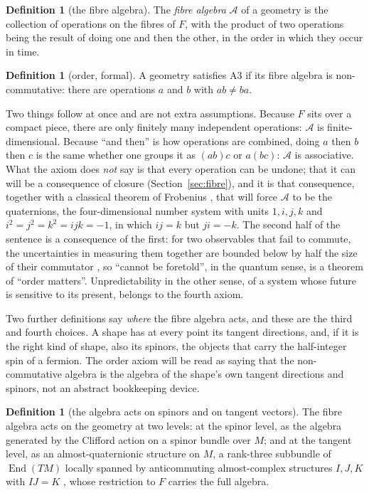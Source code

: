 \documentclass[11pt,a4paper]{article}
\theoremstyle{plain}
\theoremstyle{definition}
\newtheorem{definition}[theorem]{Definition}
\theoremstyle{remark}
\begin{document}
\begin{definition}[the fibre algebra]\label{def:fibrealg}
The \emph{fibre algebra} $\mathcal{A}$ of a geometry is the collection of operations on the fibres of $F$, with the product of two operations being the result of doing one and then the other, in the order in which they occur in time.
\end{definition}

\begin{definition}[order, formal]\label{def:A3}
A geometry satisfies A3 if its fibre algebra is non-commutative: there are operations $a$ and $b$ with $ab\neq ba$.
\end{definition}

Two things follow at once and are not extra assumptions. Because $F$ sits over a compact piece, there are only finitely many independent operations: $\mathcal{A}$ is finite-dimensional. Because ``and then'' is how operations are combined, doing $a$ then $b$ then $c$ is the same whether one groups it as $(ab)c$ or $a(bc)$: $\mathcal{A}$ is associative. What the axiom does \emph{not} say is that every operation can be undone; that it can will be a consequence of closure (Section~\ref{sec:fibre}), and it is that consequence, together with a classical theorem of Frobenius \cite{Frobenius1878}, that will force $\mathcal{A}$ to be the quaternions, the four-dimensional number system with units $1,i,j,k$ and $i^{2}=j^{2}=k^{2}=ijk=-1$, in which $ij=k$ but $ji=-k$. The second half of the sentence is a consequence of the first: for two observables that fail to commute, the uncertainties in measuring them together are bounded below by half the size of their commutator \cite{Robertson1929}, so ``cannot be foretold'', in the quantum sense, is a theorem of ``order matters''. Unpredictability in the other sense, of a system whose future is sensitive to its present, belongs to the fourth axiom.

Two further definitions say \emph{where} the fibre algebra acts, and these are the third and fourth choices. A shape has at every point its tangent directions, and, if it is the right kind of shape, also its spinors, the objects that carry the half-integer spin of a fermion. The order axiom will be read as saying that the non-commutative algebra is the algebra of the shape's own tangent directions and spinors, not an abstract bookkeeping device.

\begin{definition}[the algebra acts on spinors and on tangent vectors]\label{def:levels}
The fibre algebra acts on the geometry at two levels: at the spinor level, as the algebra generated by the Clifford action on a spinor bundle over $M$; and at the tangent level, as an almost-quaternionic structure on $M$, a rank-three subbundle of $\operatorname{End}(TM)$ locally spanned by anticommuting almost-complex structures $I,J,K$ with $IJ=K$ \cite{Salamon1982}, whose restriction to $F$ carries the full algebra.
\end{definition}
\end{document}
